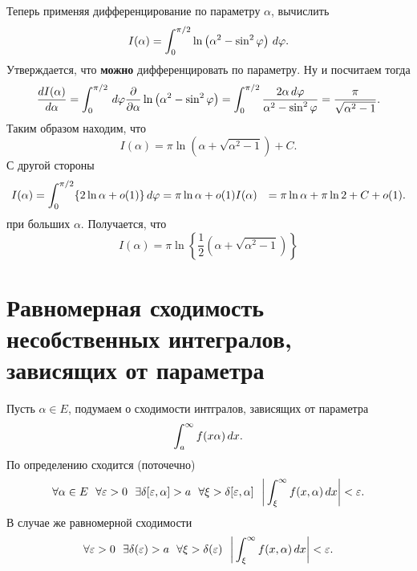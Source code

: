 Теперь применяя дифференцирование по параметру $\alpha$, вычислить
\begin{equation*}
    I(\alpha) = \int_0^{\pi/2}  \ln \left(
        \alpha^2 - \sin^2 \varphi
    \right) \, d \varphi.
\end{equation*}
Утверждается, что \textbf{можно} дифференцировать по параметру. Ну и посчитаем тогда
\begin{equation*}
    \frac{d I(\alpha)}{d \alpha} = \int_0^{\pi/2} \, d \varphi \frac{\partial }{\partial \alpha} \ln \left(\alpha^2 - \sin^2 \varphi\right) = 
    \int_0^{\pi/2} \frac{2\alpha \, d \varphi}{\alpha^2 - \sin^2 \varphi} = \frac{\pi}{\sqrt{\alpha^2-1}}.
\end{equation*}
Таким образом находим, что
\begin{equation*}
    I(\alpha) = \pi \ln ( \alpha + \sqrt{\alpha^2-1}) + C.
\end{equation*}
С другой стороны
\begin{align*}
    I(\alpha) &= \int_0^{\pi/2} \{2 \ln \alpha + o(1)\} \, d \varphi = \pi \ln \alpha + o(1)
    I(\alpha) &= \pi \ln \alpha + \pi \ln 2 + C + o(1).
\end{align*}
при больших $\alpha$. Получается, что
\begin{equation*}
    I(\alpha) = \pi \ln \left\{
        \frac{1}{2}\left(
            \alpha + \sqrt{\alpha^2-1}
        \right)
    \right\}
\end{equation*}


\section*{Равномерная сходимость несобственных интегралов, зависящих от параметра}

Пусть $\alpha \in E$, подумаем о сходимости интгралов, зависящих от параметра
\begin{equation*}
    \int_a^{\infty} f(x \alpha) \, d x.
\end{equation*}
По определению сходится (поточечно)
\begin{equation*}
    \forall \alpha \in E \ \ 
    \forall \varepsilon > 0 \ \
    \exists \delta[\varepsilon, \alpha] > a \ \
    \forall \xi > \delta[\varepsilon, \alpha] \ \
    \bigg|
        \int_{\xi}^{\infty} f(x, \alpha) \d x
    \bigg| < \varepsilon.
\end{equation*}
В случае же равномерной сходимости
\begin{equation*}
    \forall \varepsilon > 0 \ \
    \exists \delta(\varepsilon) > a \ \ 
    \forall \xi > \delta(\varepsilon) \ \ 
    \bigg|
        \int_{\xi}^{\infty} f(x, \alpha) \d x
    \bigg| < \varepsilon.
\end{equation*}

